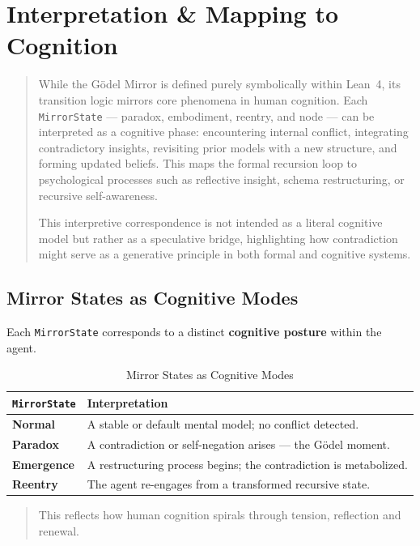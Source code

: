 \documentclass[manuscript,nonacm]{acmart}
\begin{document}
\section{Interpretation \& Mapping to Cognition}
\begin{quote}
While the Gödel Mirror is defined purely symbolically within Lean~4, its transition logic mirrors core phenomena in human cognition. Each \texttt{MirrorState} — paradox, embodiment, reentry, and node — can be interpreted as a cognitive phase: encountering internal conflict, integrating contradictory insights, revisiting prior models with a new structure, and forming updated beliefs. This maps the formal recursion loop to psychological processes such as reflective insight, schema restructuring, or recursive self-awareness. 

This interpretive correspondence is not intended as a literal cognitive model but rather as a speculative bridge, highlighting how contradiction might serve as a generative principle in both formal and cognitive systems.
\end{quote}


\subsection{Mirror States as Cognitive Modes}

Each \texttt{MirrorState} corresponds to a distinct \textbf{cognitive posture} within the agent.

\begin{table}[H]
  \caption{Mirror States as Cognitive Modes}
  \label{tab:cognitive-modes}
  \begin{tabular}{@{}lp{8cm}@{}}
    \toprule
    \textbf{\texttt{MirrorState}} & \textbf{Interpretation} \\
    \midrule
    \textbf{Normal} & A stable or default mental model; no conflict detected. \\
    \textbf{Paradox} & A contradiction or self-negation arises — the Gödel moment. \\
    \textbf{Emergence} & A restructuring process begins; the contradiction is metabolized. \\
    \textbf{Reentry} & The agent re-engages from a transformed recursive state. \\
    \bottomrule
  \end{tabular}
\end{table}

\begin{quote}
This reflects how human cognition spirals through tension, reflection and renewal.
\end{quote}
\end{document}
